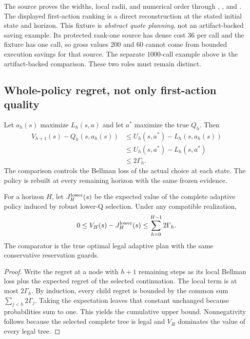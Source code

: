 The source proves the widths, local radii, and numerical order through
,
, and
. The displayed first-action
ranking is a direct reconstruction at the stated initial state and horizon.
This fixture is \emph{abstract quote planning}, not an artifact-backed saving
example. Its protected rank-one source has dense cost $36$ per call and the
fixture has one call, so gross values $200$ and $60$ cannot come from bounded
execution savings for that source. The separate $1000$-call example above is
the artifact-backed comparison. These two roles must remain distinct.

\subsection{Whole-policy regret, not only first-action quality}

Let $a_h(s)$ maximize $L_h(s,a)$ and let $a^*$ maximize the true $Q_h$.
Then
\begin{align*}
 V_{h+1}(s)-Q_h(s,a_h(s))
 &\leq U_h(s,a^*)-L_h(s,a_h(s))\\
 &\leq U_h(s,a^*)-L_h(s,a^*)\\
 &\leq 2\Gamma_h.
\end{align*}
The comparison controls the Bellman loss of the actual choice at each state.
The policy is rebuilt at every remaining horizon with the same frozen evidence.

\begin{theorem}
For a horizon $H$, let $J_H^{\rm lower}(s)$ be the expected value of the complete
adaptive policy induced by robust lower-Q selection. Under any compatible
realization,
\[
 0\leq V_H(s)-J_H^{\rm lower}(s)
 \leq\sum_{h=0}^{H-1}2\Gamma_h.
\]
The comparator is the true optimal legal adaptive plan with the same
conservative reservation guards.
\end{theorem}
\begin{proof}
Write the regret at a node with $h+1$ remaining steps as its local Bellman loss
plus the expected regret of the selected continuation. The local term is at
most $2\Gamma_h$. By induction, every child regret is bounded by the common
sum $\sum_{j<h}2\Gamma_j$. Taking the expectation leaves that constant unchanged
because probabilities sum to one. This yields the cumulative upper bound.
Nonnegativity follows because the selected complete tree is legal and $V_H$
dominates the value of every legal tree.
\end{proof}

